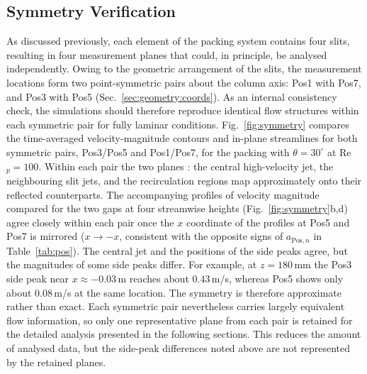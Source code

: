 \subsection{Symmetry Verification}
\label{sec:numerics:symmetry}
As discussed previously, each element of the packing system contains four slits, resulting in four measurement planes that could, in principle, be analysed independently. Owing to the geometric arrangement of the slits, the measurement locations form two point-symmetric pairs about the column axis: Pos1 with Pos7, and Pos3 with Pos5 (Sec.~\ref{sec:geometry:coords}). As an internal consistency check, the simulations should therefore reproduce identical flow structures within each symmetric pair for fully laminar conditions.
Fig.~\ref{fig:symmetry} compares the time-averaged velocity-magnitude contours and in-plane streamlines for both symmetric pairs, Pos3/Pos5 and Pos1/Pos7, for the packing with $\theta=30^\circ$ at Re$_p=100$. Within each pair the two planes : the central high-velocity jet, the neighbouring slit jets, and the recirculation regions map approximately onto their reflected counterparts. The accompanying profiles of velocity magnitude compared for the two gaps at four streamwise heights (Fig.~\ref{fig:symmetry}b,d) agree closely within each pair once the $x$ coordinate of the profiles at Pos5 and Pos7 is mirrored ($x\to-x$, consistent with the opposite signs of $a_{\mathrm{Pos},n}$ in Table~\ref{tab:pos}). The central jet and the positions of the side peaks agree, but the magnitudes of some side peaks differ. For example, at $z=180$\,mm the Pos3 side peak near $x\approx-0.03$\,m reaches about $0.43$\,m/s, whereas Pos5 shows only about $0.08$\,m/s at the same location. The symmetry is therefore approximate rather than exact. Each symmetric pair nevertheless carries largely equivalent flow information, so only one representative plane from each pair is retained for the detailed analysis presented in the following sections. This reduces the amount of analysed data, but the side-peak differences noted above are not represented by the retained planes.
